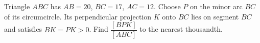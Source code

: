 Triangle $ABC$ has $AB=20$, $BC=17$, $AC=12$. Choose $P$ on the minor arc $BC$ of its circumcircle. Its perpendicular projection $K$ onto $BC$ lies on segment $BC$ and satisfies $BK=PK>0$. Find $\dfrac{[BPK]}{[ABC]}$ to the nearest thousandth.
